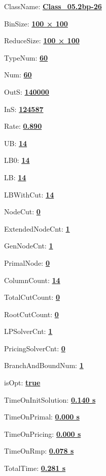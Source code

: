 \documentclass[11pt]{article}
\begin{document}
\pagestyle{empty}


ClassName: \underline{\textbf{Class_05.2bp-26}}
\par
BinSize: \underline{\textbf{100 × 100}}
\par
ReduceSize: \underline{\textbf{100 × 100}}
\par
TypeNum: \underline{\textbf{60}}
\par
Num: \underline{\textbf{60}}
\par
OutS: \underline{\textbf{140000}}
\par
InS: \underline{\textbf{124587}}
\par
Rate: \underline{\textbf{0.890}}
\par
UB: \underline{\textbf{14}}
\par
LB0: \underline{\textbf{14}}
\par
LB: \underline{\textbf{14}}
\par
LBWithCut: \underline{\textbf{14}}
\par
NodeCut: \underline{\textbf{0}}
\par
ExtendedNodeCnt: \underline{\textbf{1}}
\par
GenNodeCnt: \underline{\textbf{1}}
\par
PrimalNode: \underline{\textbf{0}}
\par
ColumnCount: \underline{\textbf{14}}
\par
TotalCutCount: \underline{\textbf{0}}
\par
RootCutCount: \underline{\textbf{0}}
\par
LPSolverCnt: \underline{\textbf{1}}
\par
PricingSolverCnt: \underline{\textbf{0}}
\par
BranchAndBoundNum: \underline{\textbf{1}}
\par
isOpt: \underline{\textbf{true}}
\par
TimeOnInitSolution: \underline{\textbf{0.140 s}}
\par
TimeOnPrimal: \underline{\textbf{0.000 s}}
\par
TimeOnPricing: \underline{\textbf{0.000 s}}
\par
TimeOnRmp: \underline{\textbf{0.078 s}}
\par
TotalTime: \underline{\textbf{0.281 s}}
\par
\newpage


\end{document}
